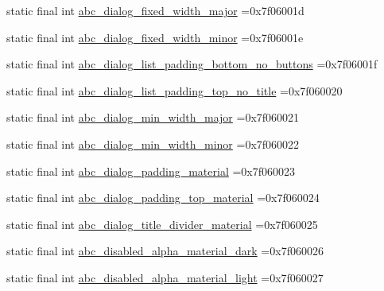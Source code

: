 \begin{DoxyCompactItemize}
static final int \mbox{\hyperlink{classbr_1_1unb_1_1cic_1_1mp_1_1marketmaster_1_1R_1_1dimen_ae089ee7f43a4b8b284a8b472d506f41b}{abc\+\_\+dialog\+\_\+fixed\+\_\+width\+\_\+major}} =0x7f06001d
\item 
static final int \mbox{\hyperlink{classbr_1_1unb_1_1cic_1_1mp_1_1marketmaster_1_1R_1_1dimen_a88c15e1702648837aedcba5a5ca2231e}{abc\+\_\+dialog\+\_\+fixed\+\_\+width\+\_\+minor}} =0x7f06001e
\item 
static final int \mbox{\hyperlink{classbr_1_1unb_1_1cic_1_1mp_1_1marketmaster_1_1R_1_1dimen_a58d70b3f4385c15ec9a79c77e4dc83d8}{abc\+\_\+dialog\+\_\+list\+\_\+padding\+\_\+bottom\+\_\+no\+\_\+buttons}} =0x7f06001f
\item 
static final int \mbox{\hyperlink{classbr_1_1unb_1_1cic_1_1mp_1_1marketmaster_1_1R_1_1dimen_af38e61f45912bf832acc72b17b3a0606}{abc\+\_\+dialog\+\_\+list\+\_\+padding\+\_\+top\+\_\+no\+\_\+title}} =0x7f060020
\item 
static final int \mbox{\hyperlink{classbr_1_1unb_1_1cic_1_1mp_1_1marketmaster_1_1R_1_1dimen_a95c1ffee7632a50ae483f0e93f316e3c}{abc\+\_\+dialog\+\_\+min\+\_\+width\+\_\+major}} =0x7f060021
\item 
static final int \mbox{\hyperlink{classbr_1_1unb_1_1cic_1_1mp_1_1marketmaster_1_1R_1_1dimen_ad166a2c7262b85cc6a501269f3501c19}{abc\+\_\+dialog\+\_\+min\+\_\+width\+\_\+minor}} =0x7f060022
\item 
static final int \mbox{\hyperlink{classbr_1_1unb_1_1cic_1_1mp_1_1marketmaster_1_1R_1_1dimen_af1e82dff7565a0faf472d816ee874777}{abc\+\_\+dialog\+\_\+padding\+\_\+material}} =0x7f060023
\item 
static final int \mbox{\hyperlink{classbr_1_1unb_1_1cic_1_1mp_1_1marketmaster_1_1R_1_1dimen_a8e965d292d6037010ed9d8d3a52a22f5}{abc\+\_\+dialog\+\_\+padding\+\_\+top\+\_\+material}} =0x7f060024
\item 
static final int \mbox{\hyperlink{classbr_1_1unb_1_1cic_1_1mp_1_1marketmaster_1_1R_1_1dimen_af73a8afc6bccce9c61d00059ee7181b1}{abc\+\_\+dialog\+\_\+title\+\_\+divider\+\_\+material}} =0x7f060025
\item 
static final int \mbox{\hyperlink{classbr_1_1unb_1_1cic_1_1mp_1_1marketmaster_1_1R_1_1dimen_a79f567ec61e8b0aec576a3e3575d6568}{abc\+\_\+disabled\+\_\+alpha\+\_\+material\+\_\+dark}} =0x7f060026
\item 
static final int \mbox{\hyperlink{classbr_1_1unb_1_1cic_1_1mp_1_1marketmaster_1_1R_1_1dimen_a825102feac0ffd54a587a6ac013ffdb1}{abc\+\_\+disabled\+\_\+alpha\+\_\+material\+\_\+light}} =0x7f060027

\end{DoxyCompactItemize}
